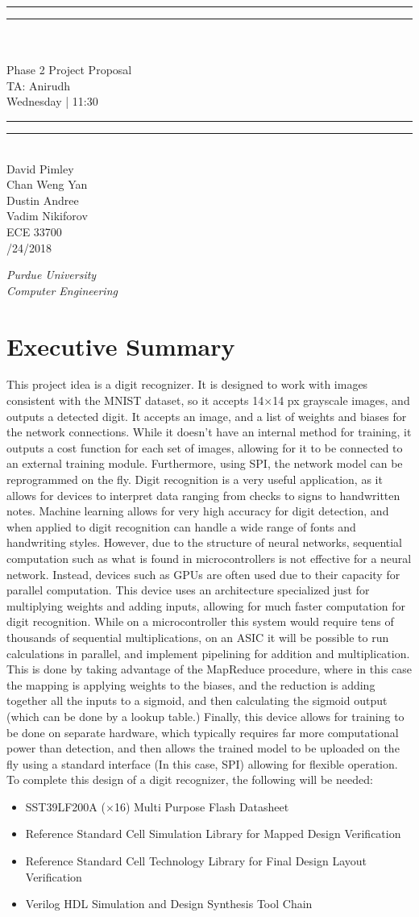 \documentclass[12pt]{article}
\newcommand*{\titleGP}{\begingroup %
\centering %
\vspace*{\baselineskip} %

\rule{\textwidth}{1.6pt}\vspace*{-\baselineskip}\vspace*{2pt} %
\rule{\textwidth}{0.4pt}\\[\baselineskip] %
{\bf \fontsize{17.5pt}{12pt}\selectfont {Handwritten Digit Recognizer using Neural Networks}}\\[0.5\baselineskip] %
{\large Phase 2 Project Proposal\\
    TA: Anirudh\\[4pt]
Wednesday | 11:30}

\rule{\textwidth}{0.4pt}\vspace*{-\baselineskip}\vspace{3.2pt} %
\rule{\textwidth}{1.6pt}\\[3\baselineskip] %



{\large\sc David Pimley} %
\\[0.5\baselineskip]
{\large\sc Chan Weng Yan} %
\\[0.5\baselineskip]
{\large\sc Dustin Andree} %
\\[0.5\baselineskip]
{\large\sc Vadim Nikiforov} %
\\[3\baselineskip]
{\large\sc ECE 33700} %
\\[0.5\baselineskip]
{\large\sc 2/24/2018} %
\\\vspace{15\baselineskip}
{\itshape Purdue University\\ Computer Engineering\par} %

\vfill %

{\large }\par %

\endgroup}
\begin{document}
\pagestyle{plain}
	\titleGP
    \newpage
    \pagestyle{fancy}

    \section{Executive Summary}
    This project idea is a digit recognizer. It is designed to work with images consistent with the MNIST dataset\cite{MNIST}, so it accepts 14$\times$14 px grayscale images, and outputs a detected digit. It accepts an image, and a list of weights and biases for the network connections. While it doesn't have an internal method for training, it outputs a cost function for each set of images, allowing for it to be connected to an external training module. Furthermore, using SPI, the network model can be reprogrammed on the fly. Digit recognition is a very useful application, as it allows for devices to interpret data ranging from checks to signs to handwritten notes. Machine learning allows for very high accuracy for digit detection, and when applied to digit recognition can handle a wide range of fonts and handwriting styles. However, due to the structure of neural networks, sequential computation such as what is found in microcontrollers is not effective for a neural network. Instead, devices such as GPUs are often used due to their capacity for parallel computation. This device uses an architecture specialized just for multiplying weights and adding inputs, allowing for much faster computation for digit recognition. While on a microcontroller this system would require tens of thousands of sequential multiplications, on an ASIC it will be possible to run calculations in parallel, and implement pipelining for addition and multiplication. This is done by taking advantage of the MapReduce procedure, where in this case the mapping is applying weights to the biases, and the reduction is adding together all the inputs to a sigmoid, and then calculating the sigmoid output (which can be done by a lookup table.) Finally, this device allows for training to be done on separate hardware, which typically requires far more computational power than detection, and then allows the trained model to be uploaded on the fly using a standard interface (In this case, SPI) allowing for flexible operation.\\

    To complete this design of a digit recognizer, the following will be needed:


    \begin{itemize}
        \item SST39LF200A ($\times$16) Multi Purpose Flash Datasheet\cite{flash}
        \item Reference Standard Cell Simulation Library for Mapped Design Verification
        \item Reference Standard Cell Technology Library for Final Design Layout Verification
        \item Verilog HDL Simulation and Design Synthesis Tool Chain
    \end{itemize}
\end{document}

